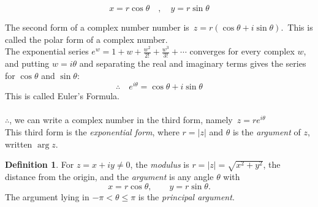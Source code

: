 \documentclass[11pt,a4paper]{article}
\theoremstyle{definition}
\newtheorem{definition}[thm]{Definition}
\begin{document}
\begin{figure}[H]
\centering
{}
\end{figure}






















$$ x = r\cos \theta \quad , \quad  y = r\sin \theta$$

The second form of a complex number number is $\, z = r\left( \cos \theta + i \sin \theta\right).\,$ This is called the polar form of a complex number.\\

The exponential series $e^{w}=1+w+\frac{w^{2}}{2!}+\frac{w^{3}}{3!}+\cdots$
converges for every complex $w$, and putting $w=i\theta$ and separating the real
and imaginary terms gives the series for $\cos\theta$ and $\sin\theta$:
$$\boxed{\therefore\quad  e^{i\theta} = \cos \theta + i\sin \theta}$$
This is called Euler's Formula.\\\\



$\therefore$, we can write a complex number in the third form, namely \,$ z = re^{i\theta}$\\

This third form is the \emph{exponential form}, where $r=\left|z\right|$ and
$\theta$ is the \emph{argument} of $z$, written $\arg z$.

\begin{definition}
For $z=x+iy\neq 0$, the \emph{modulus} is $r=\left|z\right|=\sqrt{x^{2}+y^{2}}$,
the distance from the origin, and the \emph{argument} is any angle $\theta$ with
$$x=r\cos\theta,\qquad  y=r\sin\theta .$$
The argument lying in $-\pi<\theta\leq\pi$ is the \emph{principal argument}.
\end{definition}
\end{document}
